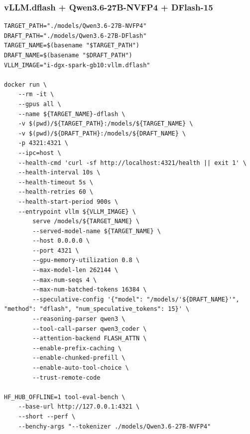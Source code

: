 \documentclass{article}
\begin{document}
\subsubsection{vLLM.dflash + Qwen3.6-27B-NVFP4 + DFlash-15}
\begin{lstlisting}
TARGET_PATH="./models/Qwen3.6-27B-NVFP4"
DRAFT_PATH="./models/Qwen3.6-27B-DFlash"
TARGET_NAME=$(basename "$TARGET_PATH")
DRAFT_NAME=$(basename "$DRAFT_PATH")
VLLM_IMAGE="i-dgx-spark-gb10:vllm.dflash"

docker run \
    --rm -it \
    --gpus all \
    --name ${TARGET_NAME}-dflash \
    -v $(pwd)/${TARGET_PATH}:/models/${TARGET_NAME} \
    -v $(pwd)/${DRAFT_PATH}:/models/${DRAFT_NAME} \
    -p 4321:4321 \
    --ipc=host \
    --health-cmd 'curl -sf http://localhost:4321/health || exit 1' \
    --health-interval 10s \
    --health-timeout 5s \
    --health-retries 60 \
    --health-start-period 900s \
    --entrypoint vllm ${VLLM_IMAGE} \
        serve /models/${TARGET_NAME} \
        --served-model-name ${TARGET_NAME} \
        --host 0.0.0.0 \
        --port 4321 \
        --gpu-memory-utilization 0.8 \
        --max-model-len 262144 \
        --max-num-seqs 4 \
        --max-num-batched-tokens 16384 \
        --speculative-config '{"model": "/models/'${DRAFT_NAME}'", "method": "dflash", "num_speculative_tokens": 15}' \
        --reasoning-parser qwen3 \
        --tool-call-parser qwen3_coder \
        --attention-backend FLASH_ATTN \
        --enable-prefix-caching \
        --enable-chunked-prefill \
        --enable-auto-tool-choice \
        --trust-remote-code

HF_HUB_OFFLINE=1 tool-eval-bench \
    --base-url http://127.0.0.1:4321 \
    --short --perf \
    --benchy-args "--tokenizer ./models/Qwen3.6-27B-NVFP4"
\end{lstlisting}
\end{document}
